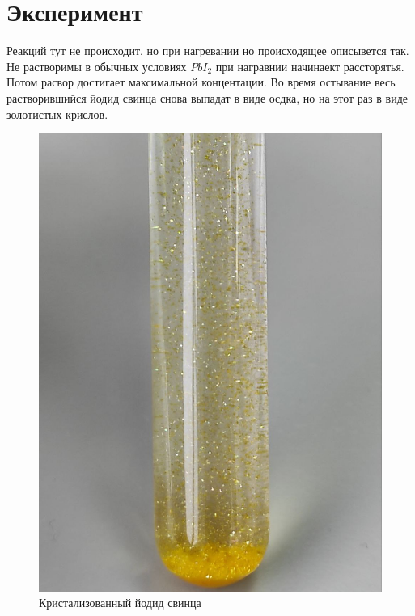 \section{Эксперимент}

\tab Реакций тут не происходит, но при нагревании но происходящее 
описывется так. Не растворимы в обычных условиях $PbI_2$ при 
награвнии начинаект рассторятья. Потом расвор достигает 
максимальной концентации. Во время остывание весь растворившийся 
йодид свинца снова выпадат в виде осдка, но на этот раз в виде 
золотистых крислов.

\begin{figure}[h]
    \centering
    \includegraphics[width=0.6\linewidth]{Ex_7/crist.jpg}
     \caption{Кристализованный йодид свинца}
    \label{ex_7_1}
\end{figure}